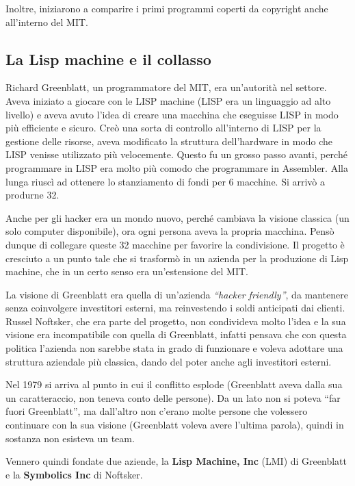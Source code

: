 Inoltre, iniziarono a comparire i primi programmi coperti da copyright anche all'interno del MIT.

\subsection{La Lisp machine e il collasso}

Richard Greenblatt, un programmatore del MIT, era un'autorità nel settore. 
Aveva iniziato a giocare con le LISP machine (LISP era un linguaggio ad alto livello) e aveva avuto l'idea di creare una macchina che eseguisse LISP in modo più efficiente e sicuro. 
Creò una sorta di controllo all'interno di LISP per la gestione delle risorse, aveva modificato la struttura dell'hardware in modo che LISP venisse utilizzato più velocemente. 
Questo fu un grosso passo avanti, perché programmare in LISP era molto più comodo che programmare in Assembler. 
Alla lunga riuscì ad ottenere lo stanziamento di fondi per 6 macchine. Si arrivò a produrne 32. 

Anche per gli hacker era un mondo nuovo, perché cambiava la visione classica (un solo computer disponibile), ora ogni persona aveva la propria macchina. Pensò dunque di collegare queste 32 macchine per favorire la condivisione. 
Il progetto è cresciuto a un punto tale che si trasformò in un azienda per la produzione di Lisp machine, che in un certo senso era un'estensione del MIT. 

La visione di Greenblatt era quella di un'azienda \textit{``hacker friendly''}, da mantenere senza coinvolgere investitori esterni, ma reinvestendo i soldi anticipati dai clienti. 
Russel Noftsker, che era parte del progetto, non condivideva molto l'idea e la sua visione era incompatibile con quella di Greenblatt, infatti pensava che con questa politica l'azienda non sarebbe stata in grado di funzionare e voleva adottare una struttura aziendale più classica, dando del poter anche agli investitori esterni.

Nel 1979 si arriva al punto in cui il conflitto esplode (Greenblatt aveva dalla sua un caratteraccio, non teneva conto delle persone). Da un lato non si poteva ``far fuori Greenblatt'', ma dall'altro non c'erano molte persone che volessero continuare con la sua visione (Greenblatt voleva avere l'ultima parola), quindi in sostanza non esisteva un team. 
 
 Vennero quindi fondate due aziende, la \textbf{Lisp Machine, Inc} (LMI) di Greenblatt e la \textbf{Symbolics Inc} di Noftsker.
 
